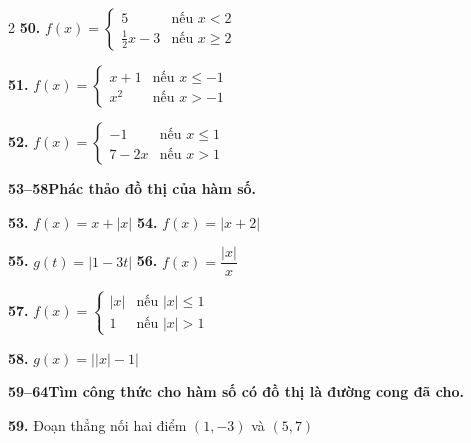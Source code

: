 \begin{multicols}{2}
\vspace{2pt}
\noindent
\textbf{50.} $f(x) = \begin{cases} 5 & \text{nếu } x < 2 \\ \frac{1}{2}x - 3 & \text{nếu } x \ge 2 \end{cases}$

\vspace{2pt}
\noindent
\textbf{51.} $f(x) = \begin{cases} x + 1 & \text{nếu } x \le -1 \\ x^2 & \text{nếu } x > -1 \end{cases}$

\vspace{2pt}
\noindent
\textbf{52.} $f(x) = \begin{cases} -1 & \text{nếu } x \le 1 \\ 7 - 2x & \text{nếu } x > 1 \end{cases}$

\vspace{3pt}
\noindent{\color{stewartcyan}\rule{\linewidth}{0.6pt}}
\vspace{3pt}

\noindent
\textbf{\color{stewartcyan}53--58}\quad \textbf{Phác thảo đồ thị của hàm số.}

\vspace{3pt}
\noindent
\noindent
\textbf{53.} $f(x) = x + |x|$ \hfill \textbf{54.} $f(x) = |x + 2|$

\vspace{2pt}
\noindent
\textbf{55.} $g(t) = |1 - 3t|$ \hfill \textbf{56.} $f(x) = \dfrac{|x|}{x}$

\vspace{2pt}
\noindent
\textbf{57.} $f(x) = \begin{cases} |x| & \text{nếu } |x| \le 1 \\ 1 & \text{nếu } |x| > 1 \end{cases}$

\vspace{2pt}
\noindent
\textbf{58.} $g(x) = \big||x| - 1\big|$

\vspace{3pt}
\noindent{\color{stewartcyan}\rule{\linewidth}{0.6pt}}
\vspace{3pt}

\noindent
\textbf{\color{stewartcyan}59--64}\quad \textbf{Tìm công thức cho hàm số có đồ thị là đường cong đã cho.}

\vspace{2pt}
\noindent
\textbf{59.} Đoạn thẳng nối hai điểm $(1, -3)$ và $(5, 7)$


\end{multicols}
